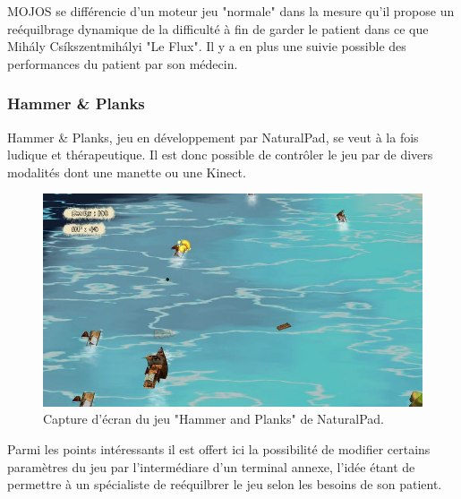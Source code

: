 MOJOS se différencie d'un moteur jeu "normale" dans la mesure qu'il propose
un reéquilbrage dynamique de la difficulté à fin de garder le patient dans
ce que Mihály Csíkszentmihályi "Le Flux". Il y a en plus une suivie possible 
des performances du patient par son médecin.


\subsubsection{Hammer \& Planks}
Hammer \& Planks, jeu en développement par NaturalPad, se veut à la fois 
ludique et thérapeutique. Il est donc possible de contrôler le jeu par de divers 
modalités dont une manette ou une Kinect.

\begin{figure}[h!]
\centering
\includegraphics[width=1.0\linewidth]{images/hammer_and_planks}
\caption{Capture d'écran du jeu "Hammer and Planks" de 
NaturalPad.}
\end{figure}

Parmi les points intéressants il est offert ici la possibilité de modifier certains
paramètres du jeu par l'intermédiare d'un terminal annexe, l'idée étant de
permettre à un spécialiste de reéquilbrer le jeu selon les besoins de son
patient.
